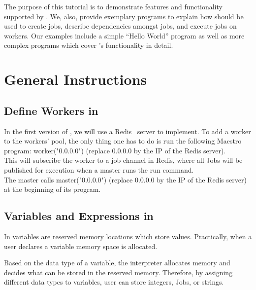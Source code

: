 
The purpose of this tutorial is to demonstrate features and functionality
supported by \lang{}. We, also,  provide exemplary programs to explain how
\lang{} should be used to create jobs, describe dependencies amongst jobs, and
execute jobs on workers. Our examples include a simple ``Hello World'' program as
well as more complex programs which cover \lang{}'s functionality in detail.


\section{General Instructions}
\label{sect:general}

\subsection*{Define Workers in \lang{}}
In the first version of \lang{}, we will use a Redis~\cite{redis} server to
implement. To add a worker to the workers' pool, the only thing one has to do
is run the following Maestro program: worker("0.0.0.0") (replace 0.0.0.0 by
the IP of the Redis server).\\
This will subscribe the worker to a job channel in Redis, where all Jobs will
be published for execution when a master runs the run command.\\
The master calls master("0.0.0.0") (replace 0.0.0.0 by the IP of the Redis server)
at the beginning of its program.

\subsection*{Variables and Expressions in \lang{}}
In \lang{} variables are reserved memory locations which store values.
Practically, when a user declares a variable memory space is allocated.

Based on the data type of a variable, the interpreter allocates memory
and decides what can be stored in the reserved memory. Therefore, by
assigning different data types to variables, user can store integers, Jobs,
or strings.

